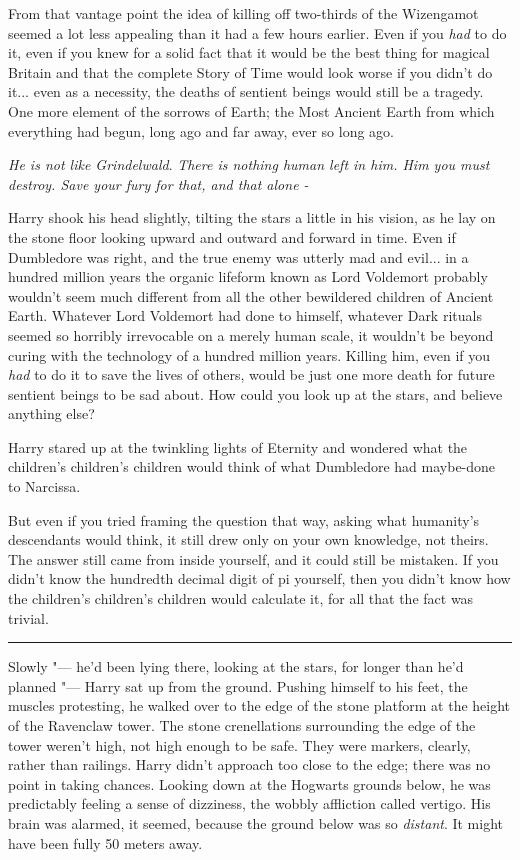 From that vantage point the idea of killing off two-thirds of the
Wizengamot seemed a lot less appealing than it had a few hours earlier.
Even if you \emph{had} to do it, even if you knew for a solid fact that
it would be the best thing for magical Britain and that the complete
Story of Time would look worse if you didn't do it... even as a
necessity, the deaths of sentient beings would still be a tragedy. One
more element of the sorrows of Earth; the Most Ancient Earth from which
everything had begun, long ago and far away, ever so long ago.

\emph{He is not like Grindelwald}. \emph{There is nothing human left in
him. Him you must destroy. Save your fury for that, and that alone -}

Harry shook his head slightly, tilting the stars a little in his vision,
as he lay on the stone floor looking upward and outward and forward in
time. Even if Dumbledore was right, and the true enemy was utterly mad
and evil... in a hundred million years the organic lifeform known
as Lord Voldemort probably wouldn't seem much different from all the
other bewildered children of Ancient Earth. Whatever Lord Voldemort had
done to himself, whatever Dark rituals seemed so horribly irrevocable on
a merely human scale, it wouldn't be beyond curing with the technology
of a hundred million years. Killing him, even if you \emph{had} to do it
to save the lives of others, would be just one more death for future
sentient beings to be sad about. How could you look up at the stars, and
believe anything else?

Harry stared up at the twinkling lights of Eternity and wondered what
the children's children's children would think of what Dumbledore had
maybe-done to Narcissa.

But even if you tried framing the question that way, asking what
humanity's descendants would think, it still drew only on your own
knowledge, not theirs. The answer still came from inside yourself, and
it could still be mistaken. If you didn't know the hundredth decimal
digit of pi yourself, then you didn't know how the children's children's
children would calculate it, for all that the fact was trivial.

\begin{center}\rule{3in}{0.4pt}\end{center}

Slowly "--- he'd been lying there, looking at the stars, for longer than
he'd planned "--- Harry sat up from the ground. Pushing himself to his
feet, the muscles protesting, he walked over to the edge of the stone
platform at the height of the Ravenclaw tower. The stone crenellations
surrounding the edge of the tower weren't high, not high enough to be
safe. They were markers, clearly, rather than railings. Harry didn't
approach too close to the edge; there was no point in taking chances.
Looking down at the Hogwarts grounds below, he was predictably feeling a
sense of dizziness, the wobbly affliction called vertigo. His brain was
alarmed, it seemed, because the ground below was so \emph{distant}. It
might have been fully 50 meters away.


